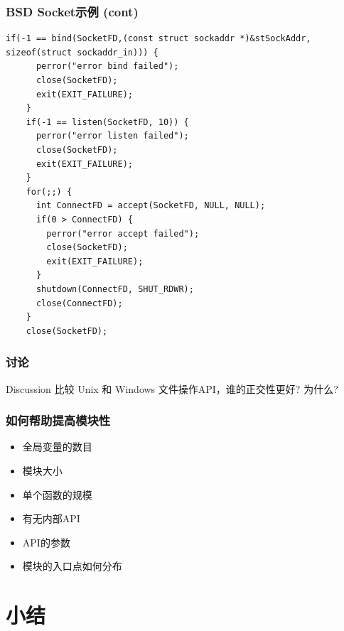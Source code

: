 \documentclass[compress]{beamer}
\begin{document}
\begin{frame}[containsverbatim]
	\frametitle{BSD Socket示例 (cont)}
\begin{lstlisting}[firstnumber=last]
    if(-1 == bind(SocketFD,(const struct sockaddr *)&stSockAddr, sizeof(struct sockaddr_in))) {
      perror("error bind failed");
      close(SocketFD);
      exit(EXIT_FAILURE);
    }
    if(-1 == listen(SocketFD, 10)) {
      perror("error listen failed");
      close(SocketFD);
      exit(EXIT_FAILURE);
    }
    for(;;) {
      int ConnectFD = accept(SocketFD, NULL, NULL);
      if(0 > ConnectFD) {
        perror("error accept failed");
        close(SocketFD);
        exit(EXIT_FAILURE);
      }
      shutdown(ConnectFD, SHUT_RDWR);
      close(ConnectFD);
    }
    close(SocketFD);
\end{lstlisting}
\end{frame}

\begin{frame}
\frametitle{讨论}
\begin{block}{Discussion} 
比较 Unix 和 Windows 文件操作API，谁的正交性更好? 为什么?
\end{block}
\end{frame}

\begin{frame}
\frametitle{如何帮助提高模块性}
\begin{itemize}
\item 全局变量的数目
\item 模块大小
\item 单个函数的规模
\item 有无内部API
\item API的参数
\item 模块的入口点如何分布
\end{itemize}
\end{frame}



\section{小结}
\end{document}
